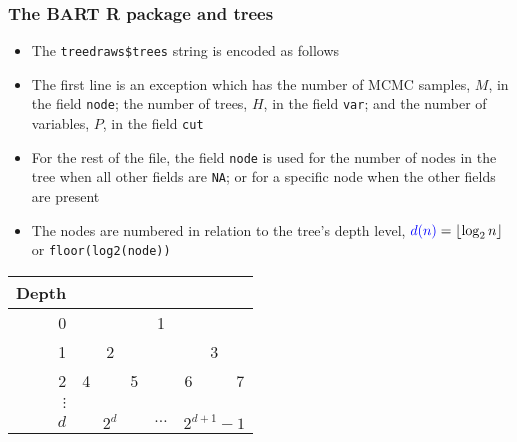 \documentclass[11pt,dvipsnames,usenames,times]{beamer}
\begin{document}
\begin{frame}[fragile]
\frametitle{The BART R package and trees}
\begin{itemize}
\item
The {\tt treedraws\$trees} string is encoded as follows
\item The
first line is an exception which has the number of MCMC samples, $M$,
in the field {\tt node}; the number of trees, $H$, in the field
{\tt var}; and the number of variables, $P$, in the field {\tt cut}
\item 
For the rest of the file, the field {\tt node} is used for the number
of nodes in the tree when all other fields are {\tt NA}; or for a
specific node when the other fields are present
\item The nodes are
numbered in relation to the tree's depth level, 
$\textcolor{blue}{d(n)}=\lfloor \log_2 n \rfloor$ or
{\tt floor(log2(node))}
\end{itemize}
\begin{center}
\begin{tabular}{r|ccccccc} \hline
Depth & \\ \hline
0 &   &   &   & 1 &   &   &   \\ %
1 &   & 2 &   &   &   & 3 &   \\
2 & 4 &   & 5 &   & 6 &   & 7 \\
$\vdots$ & \\
$d$ & \multicolumn{3}{c}{$2^d$} & $\dots$ & \multicolumn{3}{c}{$2^{d+1}\!-\!1$} \\ \hline
\end{tabular}
\end{center}
\end{frame}
\end{document}
